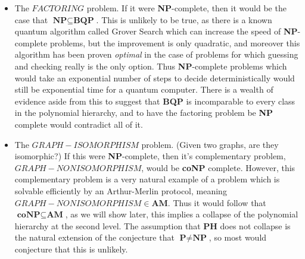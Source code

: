 \begin{itemize}
	\item The $FACTORING$ problem. If it were \textbf{NP}-complete, then it would be the case that $\textbf{NP} \subseteq \textbf{BQP}$. This is unlikely to be true, as there is a known quantum algorithm called Grover Search which can increase the speed of \textbf{NP}-complete problems, but the improvement is only quadratic, and moreover this algorithm has been proven \textit{optimal} in the case of problems for which guessing and checking really is the only option. Thus \textbf{NP}-complete problems which would take an exponential number of steps to decide deterministically would still be exponential time for a quantum computer. There is a wealth of evidence aside from this to suggest that \textbf{BQP} is incomparable to every class in the polynomial hierarchy, and to have the factoring problem be \textbf{NP} complete would contradict all of it.
	\item The $GRAPH-ISOMORPHISM$ problem. (Given two graphs, are they isomorphic?) If this were \textbf{NP}-complete, then it's complementary problem, $GRAPH-NONISOMORPHISM$, would be \textbf{coNP} complete. However, this complementary problem is a very natural example of a problem which is solvable efficiently by an Arthur-Merlin protocol, meaning $GRAPH-NONISOMORPHISM \in \textbf{AM}$. Thus it would follow that $\textbf{coNP} \subseteq \textbf{AM}$, as we will show later, this implies a collapse of the polynomial hierarchy at the second level. The assumption that \textbf{PH} does not collapse is the natural extension of the conjecture that $\textbf{P} \neq \textbf{NP}$, so most would conjecture that this is unlikely.
\end{itemize}

